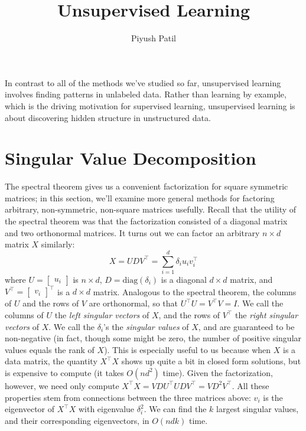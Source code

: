 \documentclass{article}
\begin{document}
\title{Unsupervised Learning}
\author{Piyush Patil}
\maketitle

In contrast to all of the methods we've studied so far, unsupervised learning involves finding patterns in unlabeled data. Rather than learning by example, which is the driving motivation for supervised learning, unsupervised learning is about discovering hidden structure in unstructured data.

\section{Singular Value Decomposition}
The spectral theorem gives us a convenient factorization for square symmetric matrices; in this section, we'll examine more general methods for factoring arbitrary, non-symmetric, non-square matrices usefully. Recall that the utility of the spectral theorem was that the factorization consisted of a diagonal matrix and two orthonormal matrices. It turns out we can factor an arbitrary $ n \times d $ matrix $ X $ similarly:
$$ X = U D V^\intercal = \sum_{i = 1}^d \delta_i u_i v_i^\intercal $$
where $ U = \begin{bmatrix} u_i \end{bmatrix} $ is $ n \times d $, $ D = \text{diag}(\delta_i) $ is a diagonal $ d \times d $ matrix, and $ V^\intercal = \begin{bmatrix} v_i \end{bmatrix}^\intercal $ is a $ d \times d $ matrix. Analogous to the spectral theorem, the columns of $ U $ and the rows of $ V $ are orthonormal, so that $ U^\intercal U = V^\intercal V = I $. We call the columns of $ U $ the \textit{left singular vectors} of $ X $, and the rows of $ V^\intercal $ the \textit{right singular vectors} of $ X $. We call the $ \delta_i $'s the \textit{singular values} of $ X $, and are guaranteed to be non-negative (in fact, though some might be zero, the number of positive singular values equals the rank of $ X $). This is especially useful to us because when $ X $ is a data matrix, the quantity $ X^\intercal X $ shows up quite a bit in closed form solutions, but is expensive to compute (it takes $ O(n d^2) $ time). Given the factorization, however, we need only compute $ X^\intercal X = V D U^\intercal U D V^\intercal = V D^2 V^\intercal $.
\newline
All these properties stem from connections between the three matrices above: $ v_i $ is the eigenvector of $ X^\intercal X $ with eigenvalue $ \delta_i^2 $. We can find the $ k $ largest singular values, and their corresponding eigenvectors, in $ O(n d k) $ time.
\end{document}
